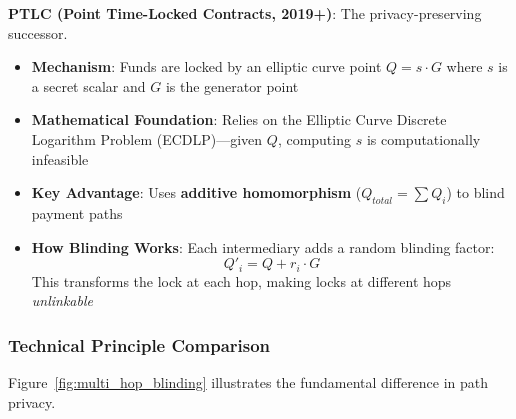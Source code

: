 \textbf{PTLC (Point Time-Locked Contracts, 2019+)}: The privacy-preserving successor.
\begin{itemize}
    \item \textbf{Mechanism}: Funds are locked by an elliptic curve point $Q = s \cdot G$ where $s$ is a secret scalar and $G$ is the generator point
    \item \textbf{Mathematical Foundation}: Relies on the Elliptic Curve Discrete Logarithm Problem (ECDLP)---given $Q$, computing $s$ is computationally infeasible
    \item \textbf{Key Advantage}: Uses \textbf{additive homomorphism} ($Q_{total} = \sum Q_i$) to blind payment paths
    \item \textbf{How Blinding Works}: Each intermediary adds a random blinding factor:
    $$Q'_i = Q + r_i \cdot G$$
    This transforms the lock at each hop, making locks at different hops \textit{unlinkable}
\end{itemize}

\subsubsection{Technical Principle Comparison}

Figure~\ref{fig:multi_hop_blinding} illustrates the fundamental difference in path privacy.

